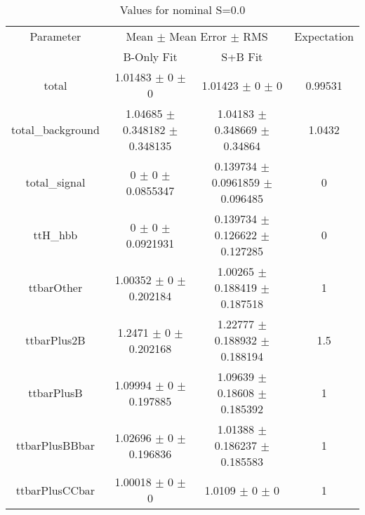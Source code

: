 \begin{table}
\centering
\caption{Values for nominal S=0.0}
\begin{tabular}{cccc}
\toprule
Parameter & \multicolumn{2}{c}{Mean $\pm$ Mean Error $\pm$ RMS} & Expectation\\
 & B-Only Fit & S+B Fit & \\
\midrule
total & \num{1.01483} $\pm$ \num{0} $\pm$ \num{0} & \num{1.01423} $\pm$ \num{0} $\pm$ \num{0} & \num{0.99531}\\
total\_background & \num{1.04685} $\pm$ \num{0.348182} $\pm$ \num{0.348135} & \num{1.04183} $\pm$ \num{0.348669} $\pm$ \num{0.34864} & \num{1.0432}\\
total\_signal & \num{0} $\pm$ \num{0} $\pm$ \num{0.0855347} & \num{0.139734} $\pm$ \num{0.0961859} $\pm$ \num{0.096485} & \num{0}\\
ttH\_hbb & \num{0} $\pm$ \num{0} $\pm$ \num{0.0921931} & \num{0.139734} $\pm$ \num{0.126622} $\pm$ \num{0.127285} & \num{0}\\
ttbarOther & \num{1.00352} $\pm$ \num{0} $\pm$ \num{0.202184} & \num{1.00265} $\pm$ \num{0.188419} $\pm$ \num{0.187518} & \num{1}\\
ttbarPlus2B & \num{1.2471} $\pm$ \num{0} $\pm$ \num{0.202168} & \num{1.22777} $\pm$ \num{0.188932} $\pm$ \num{0.188194} & \num{1.5}\\
ttbarPlusB & \num{1.09994} $\pm$ \num{0} $\pm$ \num{0.197885} & \num{1.09639} $\pm$ \num{0.18608} $\pm$ \num{0.185392} & \num{1}\\
ttbarPlusBBbar & \num{1.02696} $\pm$ \num{0} $\pm$ \num{0.196836} & \num{1.01388} $\pm$ \num{0.186237} $\pm$ \num{0.185583} & \num{1}\\
ttbarPlusCCbar & \num{1.00018} $\pm$ \num{0} $\pm$ \num{0} & \num{1.0109} $\pm$ \num{0} $\pm$ \num{0} & \num{1}\\
\bottomrule
\end{tabular}
\end{table}